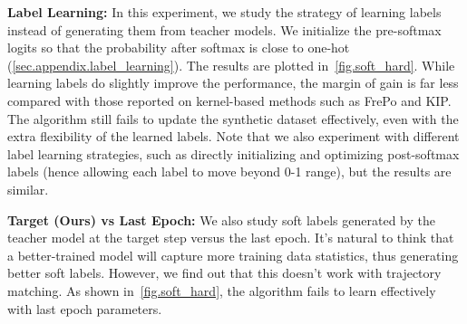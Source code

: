 \documentclass[10pt,twocolumn,letterpaper]{article}
\begin{document}
\textbf{Label Learning:} In this experiment, we study the strategy of learning labels instead of generating them from teacher models. We initialize the pre-softmax logits so that the probability after softmax is close to one-hot (\cref{sec.appendix.label_learning}).
The results are plotted in~\cref{fig.soft_hard}.
While learning labels do slightly improve the performance, the margin of gain is far less  compared with those reported on kernel-based methods such as FrePo and KIP.
The algorithm still fails to update the synthetic dataset effectively, even with the extra flexibility of the learned labels.
Note that we also experiment with different label learning strategies, such as directly initializing and optimizing post-softmax labels (hence allowing each label to move beyond 0-1 range), but the results are similar.
\begin{table}
\centering
  \caption{Ablation study on testing accuracy (\%) using hard vs soft label on ImageNet-1K. Results are measured at 1500 iterations.}
  \label{table:hard_soft}
\vspace{-3mm}
\end{table}

\textbf{Target (Ours) vs Last Epoch:} We also study soft labels generated by the teacher model 
 at the target step versus the last epoch. It's natural to think that a better-trained model will capture more training data statistics, thus generating better soft labels. However, we find out that this doesn't work with trajectory matching. As shown in~\cref{fig.soft_hard}, the algorithm fails to learn effectively with last epoch parameters.
\end{document}
